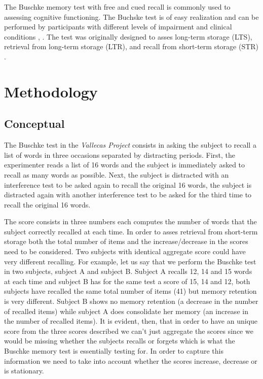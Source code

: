 \documentclass[11pt]{article}
\begin{document}
The Buschke memory test with free and cued recall is commonly used to assessing cognitive functioning. The Buchske test is of easy realization and can be performed by participants with different levels of impairment and clinical conditions \cite{o200212}, \cite{leitner2017comparison}. The test was originally designed to asses long-term storage (LTS), retrieval from long-term storage (LTR), and recall from short-term storage (STR) \cite{buschke1973selective}.



\section{Methodology}

\subsection*{Conceptual}
The Buschke test in the \emph{Vallecas Project} consists in asking the subject to recall a list of words in three occasions separated by distracting periods. First, the experimenter reads a list of 16 words and the subject is immediately asked to recall as many words as possible. Next, the subject is distracted with an interference test to be asked again to recall the original 16 words, the subject is distracted again with another interference test to be asked for the third time to recall the original 16 words.

The score consists in three numbers each computes the number of words that the subject correctly recalled at each time. In order to asses retrieval from short-term storage both the total number of items and the increase/decrease in the scores need to be considered. Two subjects with identical aggregate score could have very different recalling. For example, let us say that we perform the Buschke test in two subjects, subject A and subject B. Subject A recalls 12, 14 and 15 words at each time and subject B has for the same test a score of 15, 14 and 12, both subjects have recalled the same total number of items (41) but memory retention is very different. Subject B shows no memory retention (a decrease in the number of recalled items) while subject A does consolidate her memory (an increase in the number of recalled items).
It is evident, then, that in order to have an unique score from the three scores described we can't just aggregate the scores since we would be missing whether the subjects recalls or forgets which is what the Buschke memory test is essentially testing for. In order to capture this information we need to take into account whether the scores increase, decrease or is stationary.
\end{document}
